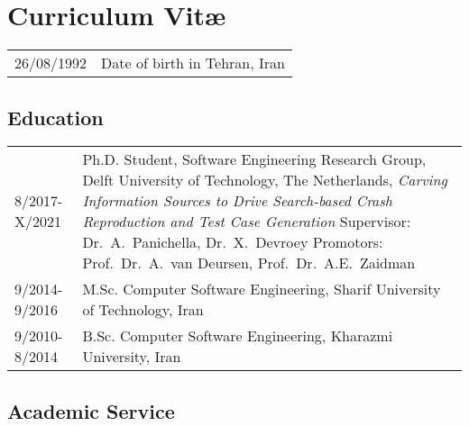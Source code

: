 \chapter*{Curriculum Vit\ae}

\makeatletter
\authors{\@firstname\ {\titleshape\@lastname}}
\makeatother

\noindent
\begin{longtable}{p{} p{}}
    26/08/1992 & Date of birth in Tehran, Iran
\end{longtable}


\section*{Education}
\begin{longtable}{p{} p{}}
    8/2017-X/2021 & Ph.D. Student, Software Engineering Research Group, \newline
    Delft University of Technology, The Netherlands, \newline
    \textit{Carving Information Sources to Drive Search-based Crash Reproduction and Test Case Generation} \newline
    Supervisor: Dr.\ A.\ Panichella, Dr.\ X.\ Devroey \newline
    Promotors: Prof.\ Dr.\ A.\ van Deursen, Prof.\ Dr.\ A.E.\ Zaidman \\
    9/2014-9/2016 & M.Sc. Computer Software Engineering, Sharif University of Technology, Iran \\
    9/2010-8/2014 & B.Sc. Computer Software Engineering, Kharazmi University, Iran
\end{longtable}

\section*{Academic Service}

